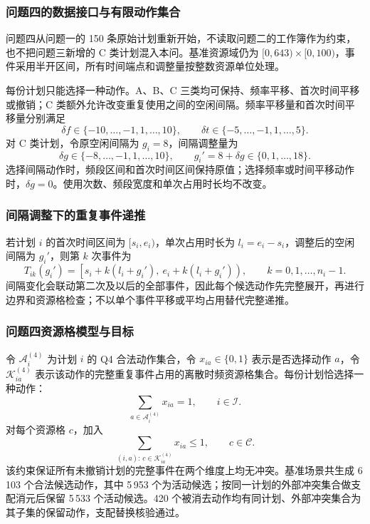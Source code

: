 \subsubsection{问题四的数据接口与有限动作集合}

问题四从问题一的 150 条原始计划重新开始，不读取问题二的工作簿作为约束，也不把问题三新增的 C 类计划混入本问。基准资源域仍为 \([0,643)\times[0,100)\)，事件采用半开区间，所有时间端点和调整量按整数资源单位处理。

每份计划只能选择一种动作。A、B、C 三类均可保持、频率平移、首次时间平移或撤销；C 类额外允许改变重复使用之间的空闲间隔。频率平移量和首次时间平移量分别满足
\[
\delta f\in\{-10,\ldots,-1,1,\ldots,10\},\qquad
\delta t\in\{-5,\ldots,-1,1,\ldots,5\}.
\]
对 C 类计划，令原空闲间隔为 \(g_i=8\)，间隔调整量为
\[
\delta g\in\{-8,\ldots,-1,1,\ldots,10\},
\qquad g_i'=8+\delta g\in\{0,1,\ldots,18\}.
\]
选择间隔动作时，频段区间和首次时间区间保持原值；选择频率或时间平移动作时，\(\delta g=0\)。使用次数、频段宽度和单次占用时长均不改变。

\subsubsection{间隔调整下的重复事件递推}

若计划 \(i\) 的首次时间区间为 \([s_i,e_i)\)，单次占用时长为 \(l_i=e_i-s_i\)，调整后的空闲间隔为 \(g_i'\)，则第 \(k\) 次事件为
\begin{equation}
T_{ik}(g_i')=
\left[s_i+k(l_i+g_i'),\ e_i+k(l_i+g_i')\right),
\qquad k=0,1,\ldots,n_i-1.
\label{eq:q4-event-expansion}
\end{equation}
间隔变化会联动第二次及以后的全部事件，因此每个候选动作先完整展开，再进行边界和资源格检查；不以单个事件平移或平均占用替代完整递推。

\subsubsection{问题四资源格模型与目标}

令 \(\mathcal A_i^{(4)}\) 为计划 \(i\) 的 Q4 合法动作集合，令 \(x_{ia}\in\{0,1\}\) 表示是否选择动作 \(a\)，令 \(\mathcal K_{ia}^{(4)}\) 表示该动作的完整重复事件占用的离散时频资源格集合。每份计划恰选择一种动作：
\begin{equation}
\sum_{a\in\mathcal A_i^{(4)}}x_{ia}=1,
\qquad i\in\mathcal I.
\label{eq:q4-one-action}
\end{equation}
对每个资源格 \(c\)，加入
\begin{equation}
\sum_{(i,a):\,c\in\mathcal K_{ia}^{(4)}}x_{ia}\le 1,
\qquad c\in\mathcal C.
\label{eq:q4-cell-clique}
\end{equation}
该约束保证所有未撤销计划的完整事件在两个维度上均无冲突。基准场景共生成 6\,103 个合法候选动作，其中 5\,953 个为活动候选；按同一计划的外部冲突集合做支配消元后保留 5\,533 个活动候选。420 个被消去动作均有同计划、外部冲突集合为其子集的保留动作，支配替换核验通过。

